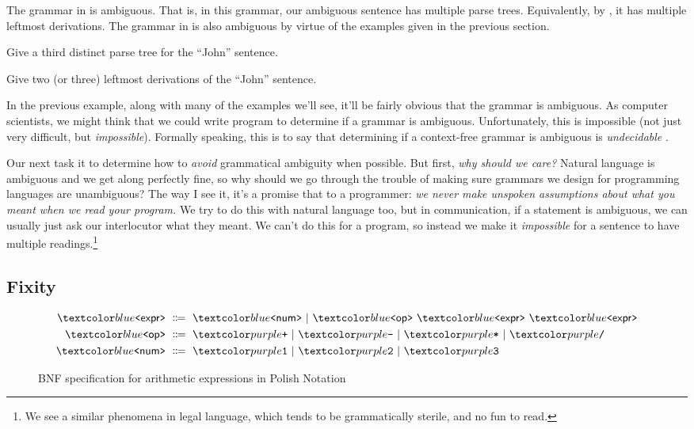 \begin{example}
  The grammar in  is ambiguous.
  That is, in this grammar, our ambiguous sentence has multiple parse trees.
  Equivalently, by , it has multiple leftmost derivations.
  The grammar in  is also ambiguous by virtue of the examples given in the previous section.
\end{example}

\begin{exercise}
  Give a third distinct parse tree for the \enquote{John} sentence.
\end{exercise}

\begin{exercise}
  Give two (or three) leftmost derivations of the \enquote{John} sentence.
\end{exercise}

\begin{remark}
  In the previous example, along with many of the examples we'll see, it'll be fairly obvious that the grammar is ambiguous.
  As computer scientists, we might think that we could write program to determine if a grammar is ambiguous.
  Unfortunately, this is impossible (not just very difficult, but \textit{impossible}).
  Formally speaking, this is to say that determining if a context-free grammar is ambiguous is \textit{undecidable} \cite{TODO}.
\end{remark}
%
Our next task it to determine how to \textit{avoid} grammatical ambiguity when possible.
But first, \textit{why should we care?}
Natural language is ambiguous and we get along perfectly fine, so why should we go through the trouble of making sure grammars we design for programming languages are unambiguous?
The way I see it, it's a promise that to a programmer: \textit{we never make unspoken assumptions about what you meant when we read your program.}
We try to do this with natural language too, but in communication, if a statement is ambiguous, we can usually just ask our interlocutor what they meant.
We can't do this for a program, so instead we make it \textit{impossible} for a sentence to have multiple readings.\footnote{We see a similar phenomena in legal language, which tends to be grammatically sterile, and no fun to read.}

\subsection{Fixity}

\begin{figure}
  \begin{align*}
    \bnfnt{expr} &\bnfeq
    \bnfnt{num} \bnfalt
    \bnfnt{op} \ \bnfnt{expr} \ \bnfnt{expr} \\
    \bnfnt{op} &\bnfeq \bnft{+} \bnfalt \bnft{-} \bnfalt \bnft{*} \bnfalt \bnft{/} \\
    \bnfnt{num} &\bnfeq \bnft{1} \bnfalt \bnft{2} \bnfalt \bnft{3}
  \end{align*}
  \caption{BNF specification for arithmetic expressions in Polish Notation}
  \label{fig:arith-polish}
\end{figure}

